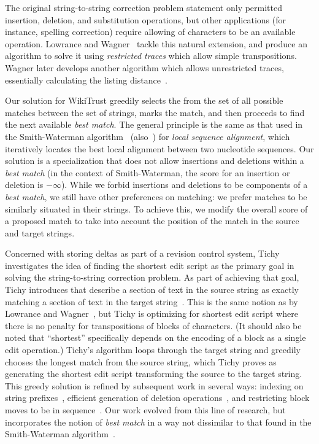 The original string-to-string correction problem statement
only permitted insertion, deletion, and substitution operations,
but other applications
(for instance, spelling correction) require allowing 
of characters to be an available operation.
Lowrance and Wagner~\cite{Lowrance1975} tackle this natural extension,
and produce an algorithm to solve it using \textit{restricted traces}
which allow simple transpositions.
Wagner later develops another algorithm which allows unrestricted
traces, essentially calculating the listing
distance~\cite{Wagner1975,Sankoff1999}.

Our solution for WikiTrust greedily selects the 
from the set of all possible matches between the set of strings, marks
the match, and then proceeds to find the next available \textit{best match}.
The general principle is the same as that used in the
Smith-Waterman algorithm~\cite{Smith1981} (also~\cite[Ch.~10]{Sankoff1999})
for \textit{local sequence alignment}, which iteratively locates the
best local alignment between two nucleotide sequences.
Our solution is a specialization that does not allow insertions
and deletions within a \textit{best match} (in the context of
Smith-Waterman, the score for an insertion or deletion is $-\infty$).
While we forbid insertions and deletions to be components of
a \textit{best match}, we still have other preferences on matching:
we prefer matches to be similarly situated in their strings.
To achieve this, we modify the overall score of a proposed match to take
into account the position of the match in the source and target strings.

Concerned with storing deltas as part of a revision control system,
Tichy investigates the idea of finding the shortest edit script as
the primary goal in solving the string-to-string correction problem.
As part of achieving that goal, Tichy introduces 
that describe a section of text in the source string as exactly matching
a section of text in the target string~\cite{Tichy1984}.
This is the same notion as  by
Lowrance and Wagner~\cite{Lowrance1975}, but Tichy is optimizing
for shortest edit script where there is no penalty for transpositions
of blocks of characters.
(It should also be noted that ``shortest'' specifically depends on
the encoding of a block as a single edit operation.)
Tichy's algorithm loops through the target string and greedily chooses
the longest match from the source string, which Tichy proves as
generating the shortest edit script transforming the source to the
target string.
This greedy solution is refined by subsequent work in several ways:
indexing on string prefixes~\cite{Obst1987},
efficient generation of deletion operations~\cite{Reichenberger1991},
and restricting block moves to be in sequence~\cite{Burns1997}.
Our work evolved from this line of research, but
incorporates the notion of \textit{best match}
in a way not dissimilar to that found in the Smith-Waterman
algorithm~\cite{Smith1981}.

